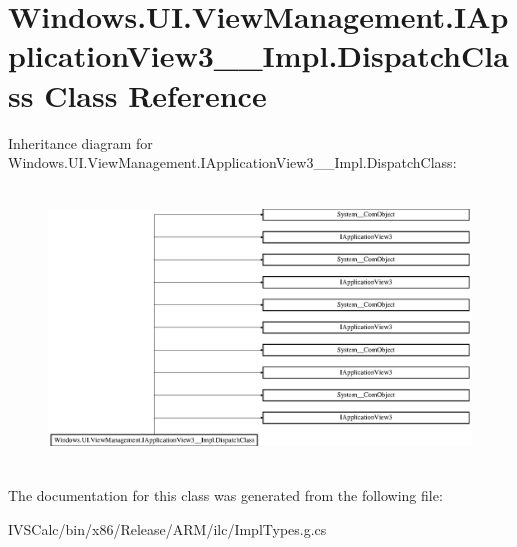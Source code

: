 \hypertarget{class_windows_1_1_u_i_1_1_view_management_1_1_i_application_view3_____impl_1_1_dispatch_class}{}\section{Windows.\+U\+I.\+View\+Management.\+I\+Application\+View3\+\_\+\+\_\+\+Impl.\+Dispatch\+Class Class Reference}
\label{class_windows_1_1_u_i_1_1_view_management_1_1_i_application_view3_____impl_1_1_dispatch_class}
Inheritance diagram for Windows.\+U\+I.\+View\+Management.\+I\+Application\+View3\+\_\+\+\_\+\+Impl.\+Dispatch\+Class\+:\begin{figure}[H]
\begin{center}
\leavevmode
\includegraphics[height=7.439613cm]{class_windows_1_1_u_i_1_1_view_management_1_1_i_application_view3_____impl_1_1_dispatch_class}
\end{center}
\end{figure}


The documentation for this class was generated from the following file\+:\begin{DoxyCompactItemize}
\item 
I\+V\+S\+Calc/bin/x86/\+Release/\+A\+R\+M/ilc/Impl\+Types.\+g.\+cs\end{DoxyCompactItemize}
